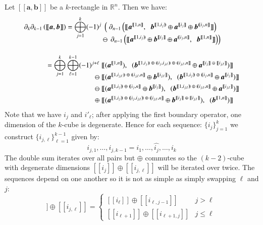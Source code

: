 Let $[\![\boldsymbol{a}, \boldsymbol{b}]\!]$ be a $k$-rectangle in $\mathbb{R}^n$.
Then we have:
\begin{align}
	\partial_k \partial_{k-1} \left( [\![ \boldsymbol{a}, \boldsymbol{b} ]\!] \right) 
	= \bigoplus_{j=1}^k (-1)^j 
		& \;  \left( \; \partial_{n-1} \left(	
			[\![ 	\boldsymbol{a}^{[\![1,n]\!]}, \;\;
				\boldsymbol{b}^{[\![1,i_j)\!)}
					\oplus \boldsymbol{a}^{[\![i_j]\!]}
					\oplus \boldsymbol{b}^{(\!(i_j,n]\!]} 
			]\!] 
		\right) \right. \notag\\[-1em]
		& \ominus \; \left. \! \partial_{n-1} \left(
			[\![ 	\boldsymbol{a}^{[\![1,i_j)\!)}
					\oplus \boldsymbol{b}^{[\![i_j]\!]}
					\oplus \boldsymbol{a}^{(\!(i_j,n]\!]} , \;\;
				\boldsymbol{b}^{[\![1,n]\!]}
			]\!] 
		\right)\right) \\[1em]
	= \bigoplus_{j=1}^k \bigoplus_{\ell=1}^{k-1} (-1)^{j+\ell}
		\;&
			[\![ 	(\boldsymbol{a}^{[\![1,n]\!]}), \;\;
				(\boldsymbol{b}^{[\![1,i_j)\!) \;\oplus\; (\!(i_j,i_{j,\ell})\!) \;\oplus\; (\!(i_{j,\ell},n]\!]}
					\oplus \boldsymbol{a}^{[\![i_j]\!] \;\oplus\; [\![i_{j,\ell}]\!]})
			]\!] \notag\\[-1em]
		\ominus \;&
			[\![ 	(\boldsymbol{a}^{[\![1,i_{j,\ell})\!) \;\oplus\; (\!(i_{j,\ell},n]\!]}
					\oplus \boldsymbol{b}^{[\![i_{j,\ell}]\!]}), \;\;
				(\boldsymbol{b}^{[\![1,i_j)\!) \;\oplus\; (\!(i_j,n]\!]}
					\oplus \boldsymbol{a}^{[\![i_j]\!]})
			]\!] \notag\\
		\ominus \; &
			[\![ 	(\boldsymbol{a}^{[\![1,i_j)\!) \;\oplus\; (\!(i_j,n]\!]}
					\oplus \boldsymbol{b}^{[\![i_j]\!]}), \;\;
				(\boldsymbol{b}^{[\![1,i_{j,\ell})\!) \;\oplus\; (\!(i_{j,\ell},n]\!]}
					\oplus \boldsymbol{a}^{[\![i_{j,\ell}]\!]})
			]\!] \notag\\
		\oplus \;&
			[\![ 	(\boldsymbol{a}^{[\![1,i_j)\!) \;\oplus\; (\!(i_j,i_{j,\ell})\!) \;\oplus\; (\!(i_{j,\ell},n]\!]}
					\oplus \boldsymbol{b}^{[\![i_j]\!] \;\oplus\; [\![i_{j,\ell}]\!]}), \;\;
				(\boldsymbol{b}^{[\![1,n]\!]})
			]\!] 
\end{align}
Note that we have $i_j$ and $i'_\ell$; after applying the first boundary operator, one dimension of the $k$-cube is degenerate.
Hence for each sequence: $\{i_j\}_{j=1}^k$ we construct $\{i_{j,\ell}\}_{\ell=1}^{k-1}$ given by:
\begin{equation}
	i_{j,1} , \ldots, i_{j,k-1} = i_1, \ldots, \widehat{i_j}, \ldots, i_k
\end{equation}
The double sum iterates over all pairs but $\oplus$ commutes so the $(k-2)$-cube with degenerate dimensions $[\![i_j]\!] \oplus [\![i_{j,\ell}]\!]$ will be iterated over twice. 
The sequences depend on one another so it is not as simple as simply swapping $\ell$ and $j$:
\begin{equation}
   [\![i_j]\!] \oplus [\![i_{j,\ell}]\!] =
     \begin{cases}
       [\![i_\ell]\!] \oplus [\![i_{\ell,j-1}]\!] & j > \ell \\
       [\![i_{\ell+1}]\!] \oplus [\![i_{\ell+1,j}]\!] & j \leq \ell
     \end{cases}
\end{equation}


